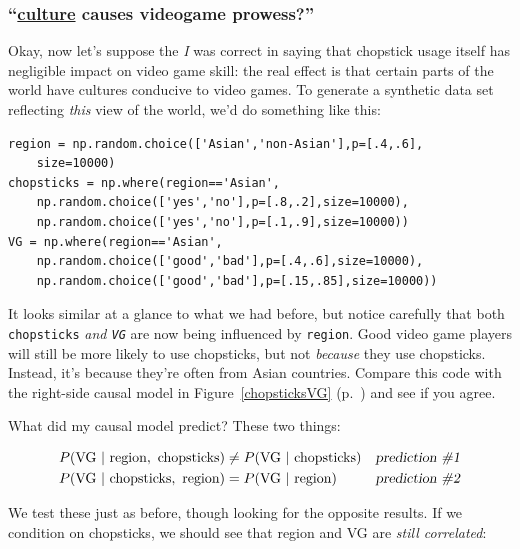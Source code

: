 \subsubsection{``\underline{culture} causes videogame prowess?''}

Okay, now let's suppose the \textit{I} was correct in saying that chopstick
usage itself has negligible impact on video game skill: the real effect is that
certain parts of the world have cultures conducive to video games. To generate
a synthetic data set reflecting \textit{this} view of the world, we'd do
something like this:

\begin{Verbatim}[fontsize=\footnotesize,samepage=true,frame=single,framesep=3mm]
region = np.random.choice(['Asian','non-Asian'],p=[.4,.6],
    size=10000)
chopsticks = np.where(region=='Asian',
    np.random.choice(['yes','no'],p=[.8,.2],size=10000),
    np.random.choice(['yes','no'],p=[.1,.9],size=10000))
VG = np.where(region=='Asian',
    np.random.choice(['good','bad'],p=[.4,.6],size=10000),
    np.random.choice(['good','bad'],p=[.15,.85],size=10000))
\end{Verbatim}

It looks similar at a glance to what we had before, but notice carefully that
both \texttt{chopsticks} \textit{and \texttt{VG}} are now being influenced by
\texttt{region}. Good video game players will still be more likely to use
chopsticks, but not \textit{because} they use chopsticks. Instead, it's because
they're often from Asian countries. Compare this code with the right-side
causal model in Figure~\ref{chopsticksVG} (p.~\pageref{chopsticksVG}) and see
if you agree.


What did my causal model predict? These two things:

\vspace{-.2in}
\begin{align*}
P(\textrm{VG}\ |\ \textrm{region},\ \textrm{chopsticks}) &\neq
P(\textrm{VG}\ |\ \textrm{chopsticks}) & \textsl{prediction \#1} \\
P(\textrm{VG}\ |\ \textrm{chopsticks},\ \textrm{region}) &=
P(\textrm{VG}\ |\ \textrm{region}) & \textsl{prediction \#2} \\
\end{align*}
\vspace{-.2in}

We test these just as before, though looking for the opposite results. If we
condition on chopsticks, we should see that \textsf{region} and \textsf{VG} are
\textit{still correlated}:

